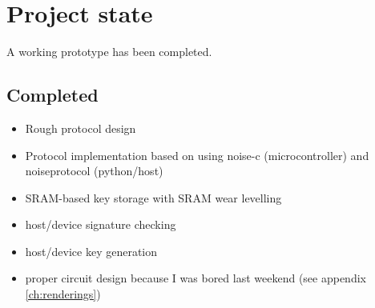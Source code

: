 \documentclass[12pt,a4paper,notitlepage]{article}
\begin{document}
%


\nocite{*}
\printbibliography

\appendix
\section{Project state}
A working prototype has been completed.

\subsection{Completed}
\begin{itemize}
    \item Rough protocol design
    \item Protocol implementation based on \textcite{perrin01} using noise-c (microcontroller) and noiseprotocol (python/host)
    \item SRAM-based key storage with SRAM wear levelling
    \item host/device signature checking
    \item host/device key generation
    \item proper circuit design because I was bored last weekend (see appendix \ref{ch:renderings})
\end{itemize}
\end{document}
